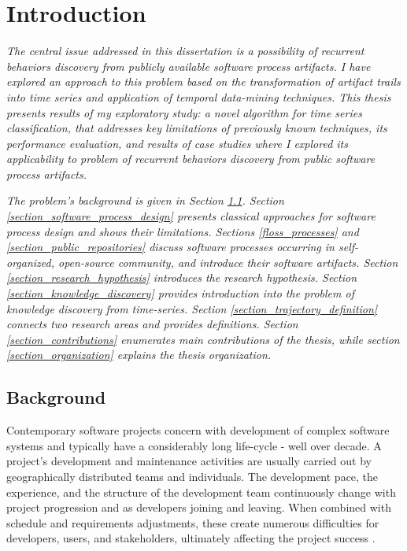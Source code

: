 \chapter{Introduction}\label{chapter_introduction}
\textit{The central issue addressed in this dissertation is a possibility of recurrent behaviors discovery from 
publicly available software process artifacts. I have explored an approach to this problem based on the 
transformation of artifact trails into time series and application of temporal data-mining techniques. 
This thesis presents results of my exploratory study: a novel algorithm for time series classification, 
that addresses key limitations of previously known techniques, its performance evaluation, and results
of case studies where I explored its applicability to problem of recurrent behaviors discovery from 
public software process artifacts.}

\textit{The problem's background is given in Section \ref{section_background}. 
Section \ref{section_software_process_design} presents classical approaches for software process design and 
shows their limitations. 
Sections \ref{floss_processes} and \ref{section_public_repositories} discuss software processes occurring in 
self-organized, open-source community, and introduce their software artifacts.
Section \ref{section_research_hypothesis} introduces the research hypothesis.
Section \ref{section_knowledge_discovery} provides introduction into the problem of knowledge discovery from time-series.
Section \ref{section_trajectory_definition} connects two research areas and provides definitions.
Section \ref{section_contributions} enumerates main contributions of the thesis, 
while section \ref{section_organization} explains the thesis organization.}

%
%
\section{Background}\label{section_background}
Contemporary software projects concern with development of complex software systems and typically have 
a considerably long life-cycle - well over decade.
A project's development and maintenance activities are usually carried out by geographically 
distributed teams and individuals. The development pace, the experience, and the structure of the 
development team continuously change with project progression and as developers joining and leaving. 
When combined with schedule and requirements adjustments, these create numerous difficulties 
for developers, users, and stakeholders, ultimately affecting the project success \cite{citeulike:2207657}. 

